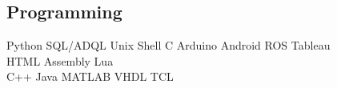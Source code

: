 \documentclass[]{deedy-resume-openfont}
\begin{document}
\begin{minipage}[t]{0.35\textwidth}

\subsection{Programming}
\textbullet{}Python \textbullet{}SQL/ADQL \textbullet{}Unix Shell \textbullet{}C \textbullet{}Arduino \textbullet{}Android  \textbullet{}ROS \textbullet{}Tableau\\ 
  \textbullet{}HTML \textbullet{}Assembly \textbullet{}Lua\\
\textbullet{}C++ \textbullet{}Java
\textbullet{}MATLAB \textbullet{}VHDL \textbullet{}TCL
\vspace{0.05in}
%
%

\end{minipage} 
\hfill\vline\hfill
\end{document}
